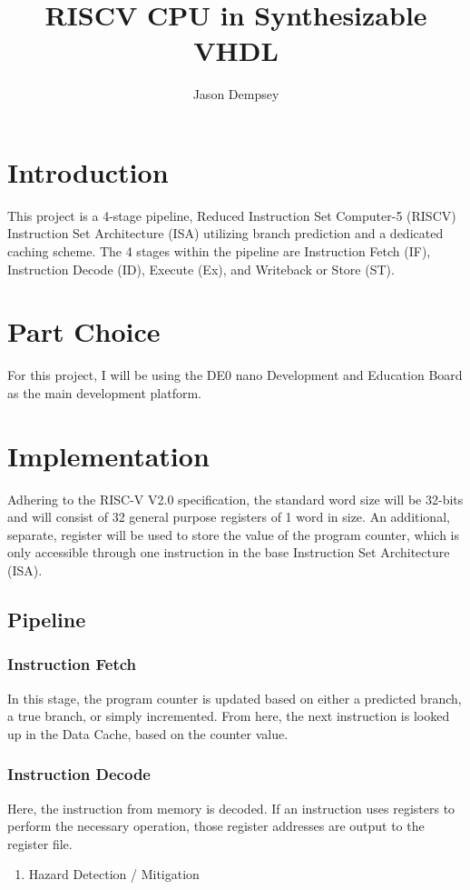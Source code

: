 \documentclass[11pt]{article}
\author{Jason Dempsey}
\date{}
\title{RISCV CPU in Synthesizable VHDL}
\begin{document}
\maketitle


\section{Introduction}
\label{sec-1}
This project is a 4-stage pipeline, Reduced Instruction Set Computer-5 (RISCV) Instruction Set Architecture (ISA) utilizing branch prediction and a dedicated caching scheme. The 4 stages within the pipeline are Instruction Fetch (IF), Instruction Decode (ID), Execute (Ex), and Writeback or Store (ST).

\section{Part Choice}
\label{sec-2}
For this project, I will be using the DE0 nano Development and Education Board as the main development platform. 

\section{Implementation}
\label{sec-3}
Adhering to the RISC-V V2.0 specification, the standard word size will be 32-bits and will consist of 32 general purpose registers of 1 word in size. An additional, separate, register will be used to store the value of the program counter, which is only accessible through one instruction in the base Instruction Set Architecture (ISA).


\subsection{Pipeline}
\label{sec-3-1}

\subsubsection{Instruction Fetch}
\label{sec-3-1-1}
In this stage, the program counter is updated based on either a predicted branch, a true branch, or simply incremented. From here, the next instruction is looked up in the Data Cache, based on the counter value. 
\subsubsection{Instruction Decode}
\label{sec-3-1-2}
Here, the instruction from memory is decoded. If an instruction uses registers to perform the necessary operation, those register addresses are output to the register file.
\begin{enumerate}
\item Hazard Detection / Mitigation
\label{sec-3-1-2-1}
\end{enumerate}
\end{document}
